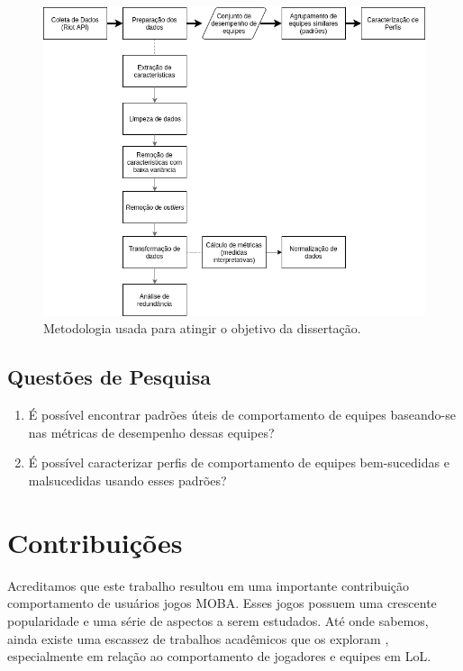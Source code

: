 \begin{figure}
  \centering
  \includegraphics[width=1.0\textwidth]{metodologia}%
  \caption{Metodologia usada para atingir o objetivo da dissertação.}
  \label{fig:metodologia}
\end{figure}

\subsection{Questões de Pesquisa}

\begin{enumerate}[label=(\roman*)]
  \item \fj{}{}É possível encontrar padrões úteis de comportamento de equipes baseando-se nas métricas de desempenho dessas equipes?
  \item \fj{}{}É possível caracterizar perfis de comportamento de equipes bem-sucedidas e malsucedidas usando esses padrões?
\end{enumerate}

\section{Contribuições}
Acreditamos que este trabalho resultou em uma importante contribuição  comportamento de usuários  jogos MOBA. Esses jogos possuem uma crescente popularidade e uma série de aspectos a serem estudados. Até onde sabemos, ainda existe uma escassez de trabalhos acadêmicos que os exploram \cite{drachen2014skill} \cite{ong2015player}, especialmente em relação ao comportamento de jogadores e equipes em LoL.

